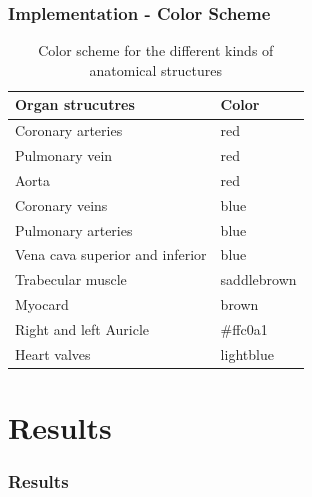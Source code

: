 \documentclass{beamer}
\begin{document}
\begin{frame}
\frametitle{Implementation - Color Scheme}

\begin{table}[h]
\begin{tabular}{ll}
Organ strucutres           & Color \\
\hline
Coronary arteries & red   \\
Pulmonary vein    & red   \\
Aorta             & red   \\
Coronary veins    & blue   \\
Pulmonary arteries    & blue   \\
Vena cava superior and inferior    & blue   \\
Trabecular muscle    & saddlebrown   \\
Myocard    & brown   \\
Right and left Auricle    & \#ffc0a1   \\
Heart valves    & lightblue   \\
\end{tabular}
\caption{Color scheme for the different kinds of anatomical structures}
\end{table}
\end{frame}

\section{Results} 
\frametitle{Results}
\end{document}
